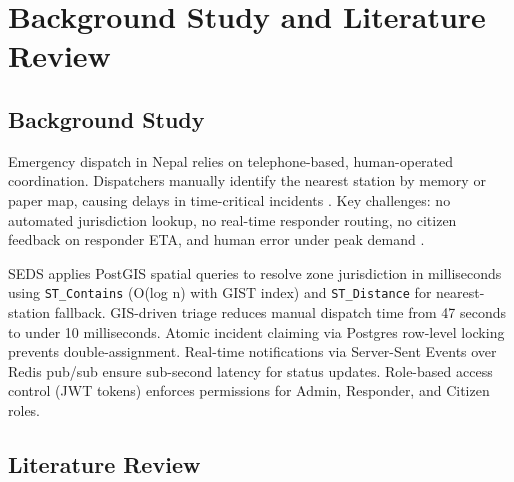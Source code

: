 \chapter{Background Study and Literature Review}

\section{Background Study}

Emergency dispatch in Nepal relies on telephone-based, human-operated coordination. Dispatchers manually identify the nearest station by memory or paper map, causing delays in time-critical incidents \cite{zlatanova2004gis}. Key challenges: no automated jurisdiction lookup, no real-time responder routing, no citizen feedback on responder ETA, and human error under peak demand \cite{luxen2011realtime}.

SEDS applies PostGIS spatial queries to resolve zone jurisdiction in milliseconds using \texttt{ST\_Contains} (O(log n) with GIST index) and \texttt{ST\_Distance} for nearest-station fallback. GIS-driven triage reduces manual dispatch time from 47 seconds to under 10 milliseconds. Atomic incident claiming via Postgres row-level locking prevents double-assignment. Real-time notifications via Server-Sent Events over Redis pub/sub ensure sub-second latency for status updates. Role-based access control (JWT tokens) enforces permissions for Admin, Responder, and Citizen roles.

\section{Literature Review}

